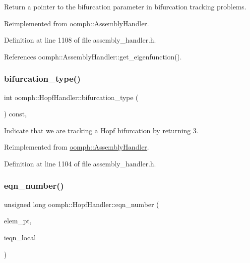 Return a pointer to the bifurcation parameter in bifurcation tracking problems. 



Reimplemented from \hyperlink{classoomph_1_1AssemblyHandler_a3e369ec692c3d36a4a2a8a64dab7fe2b}{oomph\+::\+Assembly\+Handler}.



Definition at line 1108 of file assembly\+\_\+handler.\+h.



References oomph\+::\+Assembly\+Handler\+::get\+\_\+eigenfunction().

\mbox{\label{classoomph_1_1HopfHandler_a789de82e82adaac82b366bbaa7f7ce59}} 
\subsubsection{\texorpdfstring{bifurcation\+\_\+type()}{bifurcation\_type()}}
{\footnotesize\ttfamily int oomph\+::\+Hopf\+Handler\+::bifurcation\+\_\+type (\begin{DoxyParamCaption}{ }\end{DoxyParamCaption}) const\hspace{0.3cm}{\ttfamily [inline]}, {\ttfamily [virtual]}}



Indicate that we are tracking a Hopf bifurcation by returning 3. 



Reimplemented from \hyperlink{classoomph_1_1AssemblyHandler_a22c5f240674e4f6cee12006790c11dae}{oomph\+::\+Assembly\+Handler}.



Definition at line 1104 of file assembly\+\_\+handler.\+h.

\mbox{\label{classoomph_1_1HopfHandler_a9feb8087e8b9554164c0de002f4ec056}} 
\subsubsection{\texorpdfstring{eqn\+\_\+number()}{eqn\_number()}}
{\footnotesize\ttfamily unsigned long oomph\+::\+Hopf\+Handler\+::eqn\+\_\+number (\begin{DoxyParamCaption}\item[{\hyperlink{classoomph_1_1GeneralisedElement}{Generalised\+Element} $\ast$const \&}]{elem\+\_\+pt,  }\item[{const unsigned \&}]{ieqn\+\_\+local }\end{DoxyParamCaption})\hspace{0.3cm}{\ttfamily [virtual]}}



